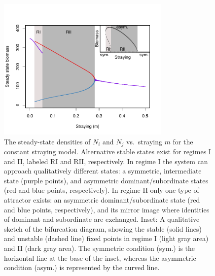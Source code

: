 \documentclass{revtex4}
\begin{document}

\clearpage


\begin{figure}
  \captionsetup{justification=raggedright,
singlelinecheck=false
}
\centering
\includegraphics[width=0.75\textwidth]{fig_traj2.pdf}
\caption{
The steady-state densities of $N_i$ and $N_j$ vs.~straying $m$ for the constant straying model. 
Alternative stable states exist for regimes I and II, labeled RI and RII, respectively. 
In regime I the system can approach qualitatively different states: a symmetric, intermediate state (purple points), and asymmetric dominant/subordinate states (red and blue points, respectively). 
In regime II only one type of attractor exists: an asymmetric dominant/subordinate state (red and blue points, respectively), and its mirror image where identities of dominant and subordinate are exchanged.
Inset: A qualitative sketch of the bifurcation diagram, showing the stable (solid lines) and unstable (dashed line) fixed points in regime I (light gray area) and II (dark gray area).
The symmetric condition (sym.) is the horizontal line at the base of the inset, whereas the asymmetric condition (asym.) is represented by the curved line.
} \label{fig:traj}
\end{figure}
\end{document}
